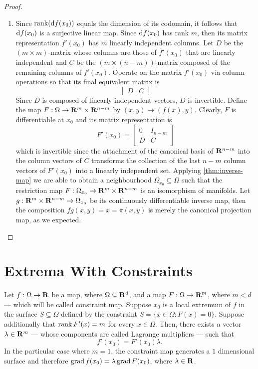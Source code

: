\begin{proof}
\begin{enumerate}
    \item Since \(\operatorname{rank}(\mathrm{d} f(x_0))\) equals the dimension of its codomain, it
      follows that \(\mathrm{d} f(x_0)\) is a surjective linear map. Since \(\mathrm{d}
      f(x_0)\) has rank \(m\), then its matrix representation \(f'(x_0)\) has
      \(m\) linearly independent columns. Let \(D\) be the \((m \times m)\)-matrix
      whose columns
      are those of \(f'(x_0)\) that are linearly independent and \(C\) be the
      \((m \times (n - m))\)-matrix composed of the remaining columns of
      \(f'(x_0)\). Operate on the matrix \(f'(x_0)\) via column operations so
      that its final equivalent matrix is
      \[
        \begin{bmatrix}
          D & C
        \end{bmatrix}
      \]
      Since \(D\) is composed of linearly independent vectors, \(D\) is
      invertible. Define the map \(F: \Omega \to \mathbf{R}^m \times \mathbf{R}^{n-m}\) by \((x, y) \mapsto (f(x),
      y)\). Clearly, \(F\) is differentiable at \(x_0\) and its matrix
      representation is
      \[
        F'(x_0) =
        \begin{bmatrix}
          0 & I_{n - m}\\
          D & C
        \end{bmatrix}
      \]
      which is invertible since the attachment of the canonical basis of
      \(\mathbf{R}^{n-m}\) into the column vectors of \(C\) transforms the collection of
      the last \(n - m\) column vectors of \(F'(x_{0})\) into a linearly
      independent set. Applying \cref{thm:inverse-map} we are able to obtain a
      neighbourhood \(\Omega_{x_0} \subseteq \Omega\) such that the restriction map \(F: \Omega_{x_0} \to
      \mathbf{R}^m \times\mathbf{R}^{n-m}\) is an isomorphism of manifolds. Let \(g: \mathbf{R}^m \times \mathbf{R}^{n-m} \to
      \Omega_{x_0}\) be its continuously differentiable inverse map, then the
      composition \(f g(x, y) = x = \pi(x, y)\) is merely the canonical projection
      map, as we expected.
  \end{enumerate}
\end{proof}

\section{Extrema With Constraints}

\begin{theorem}
  \label{thm:existence-lagrange-multipliers}
  Let \(f: \Omega \to \mathbf{R}\) be a map, where \(\Omega \subseteq \mathbf{R}^d\), and a map \(F: \Omega \to \mathbf{R}^m\),
  where \(m < d\) ---  which will be called constraint map. Suppose \(x_0\) is a
  local extremum of \(f\) in the surface \(S \subseteq \Omega\) defined by the constraint \(S
  = \{x \in \Omega : F(x) = 0\}\). Suppose additionally that \(\operatorname{rank} F'(x) = m\) for
  every \(x \in \Omega\). Then, there exists a vector \(\lambda \in \mathbf{R}^m\) --- whose components
  are called Lagrange multipliers --- such that
  \[
    f'(x_0) = F'(x_0) \lambda.
  \]
  In the particular case where \(m = 1\), the constraint map generates a \(1\)
  dimensional surface and therefore \(\operatorname{grad} f(x_0) = \lambda \operatorname{grad} F(x_0)\), where
  \(\lambda \in \mathbf{R}\).
\end{theorem}

